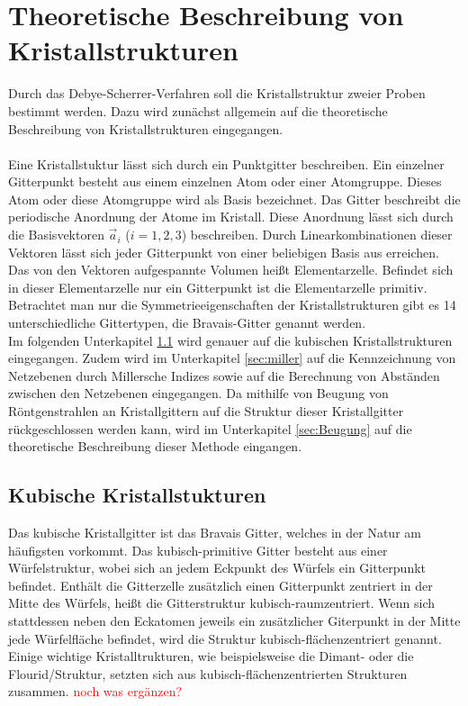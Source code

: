 \section{Theoretische Beschreibung von Kristallstrukturen}
Durch das Debye-Scherrer-Verfahren soll die Kristallstruktur zweier Proben bestimmt werden.
Dazu wird zunächst allgemein auf die theoretische Beschreibung von Kristallstrukturen eingegangen.\\
\\
Eine Kristallstuktur lässt sich durch ein Punktgitter beschreiben.
Ein einzelner Gitterpunkt besteht aus einem einzelnen Atom oder einer Atomgruppe.
Dieses Atom oder diese Atomgruppe wird als Basis bezeichnet.
Das Gitter beschreibt die periodische Anordnung der Atome im Kristall.
Diese Anordnung lässt sich durch die Basisvektoren $\vec a_i$ ($i=1,2,3$) beschreiben.
Durch Linearkombinationen dieser Vektoren lässt sich jeder Gitterpunkt von einer beliebigen Basis aus erreichen.\\
Das von den Vektoren aufgespannte Volumen heißt Elementarzelle.
Befindet sich in dieser Elementarzelle nur ein Gitterpunkt ist die Elementarzelle primitiv.
Betrachtet man nur die Symmetrieeigenschaften der Kristallstrukturen gibt es 14 unterschiedliche Gittertypen, die Bravais-Gitter genannt werden.\\
Im folgenden Unterkapitel \ref{sec:kubisch} wird genauer auf die kubischen Kristallstrukturen eingegangen.
Zudem wird im Unterkapitel \ref{sec:miller} auf die Kennzeichnung von Netzebenen durch Millersche Indizes sowie auf die Berechnung von Abständen zwischen den Netzebenen eingegangen.
Da mithilfe von Beugung von Röntgenstrahlen an Kristallgittern auf die Struktur dieser Kristallgitter rückgeschlossen werden kann, wird im Unterkapitel \ref{sec:Beugung} auf die theoretische Beschreibung dieser Methode eingangen.

\subsection{Kubische Kristallstukturen}
\label{sec:kubisch}
Das kubische Kristallgitter ist das Bravais Gitter, welches in der Natur am häufigsten vorkommt.
Das kubisch-primitive Gitter besteht aus einer Würfelstruktur, wobei sich an jedem Eckpunkt des Würfels ein Gitterpunkt befindet.
Enthält die Gitterzelle  zusätzlich einen Gitterpunkt zentriert in der Mitte des Würfels, heißt die Gitterstruktur kubisch-raumzentriert.
Wenn sich stattdessen neben den Eckatomen jeweils ein zusätzlicher Giterpunkt in der Mitte jede Würfelfläche befindet, wird die Struktur kubisch-flächenzentriert genannt.\\
Einige wichtige Kristalltrukturen, wie beispielsweise die Dimant- oder die Flourid\-/Struktur, setzten sich aus kubisch-flächenzentrierten Strukturen zusammen.
\textcolor{red}{noch was ergänzen?}

